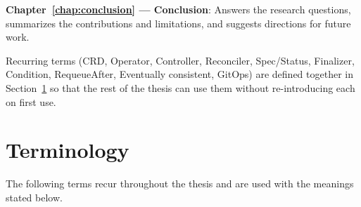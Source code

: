 \textbf{Chapter~\ref{chap:conclusion} --- Conclusion}: Answers the research questions, summarizes the contributions and limitations, and suggests directions for future work.

Recurring terms (CRD, Operator, Controller, Reconciler, Spec/Status, Finalizer, Condition, RequeueAfter, Eventually consistent, GitOps) are defined together in Section~\ref{sec:terminology} so that the rest of the thesis can use them without re-introducing each on first use.

\section{Terminology}\label{sec:terminology}

The following terms recur throughout the thesis and are used with the meanings stated below.

